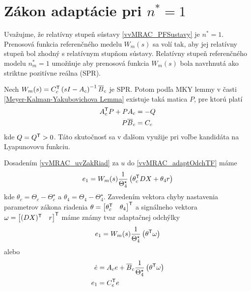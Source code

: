 ﻿\documentclass[a4paper, 10pt, ]{article}
\begin{document}
\section{Zákon adaptácie pri $n^* = 1$}


Uvažujme, že relatívny stupeň sústavy \eqref{vvMRAC_PFSustavy} je $n^* = 1$. Prenosová funkcia referenčného medelu $W_m(s)$ sa volí tak, aby jej relatívny stupeň bol zhodný s relatívnym stupňom sústavy. Relatívny stupeň referenčného modelu $n_m^* = 1$ umožňuje aby prenosová funkcia $W_m(s)$ bola navrhnutá ako striktne pozitívne reálna (SPR).

Nech $W_m(s) = C_c^{\mathsf{T}} \left( s I - A_c \right)^{-1} \overline{B}_c$ je SPR. Potom podľa MKY lemmy v časti \ref{Meyer-Kalman-Yakubovichova Lemma} existuje taká matica $P$, pre ktorú platí
\begin{subequations} \label{vvMRAC_dosledkyMKYlemmy}
	\begin{align}
		A_c^{\mathsf{T}} P  +  P  A_c  &=  - Q \\
		P  \overline{B}_c &=   C_c
	\end{align}
\end{subequations}
kde $Q = Q^{\mathsf{T}} > 0$. Táto skutočnosť sa v ďalšom využije pri voľbe kandidáta na Lyapunovovu funkciu.

Dosadením \eqref{vvMRAC_uvZakRiad} za $u$ do \eqref{vvMRAC_adaptOdchTF} máme
\begin{equation} \label{vvMRAC_adaptOdchmedziDefTF}
	e_1 = W_m(s) \frac{1}{\Theta_4^\star} \left( \theta_c^{\mathsf{T}} D X + \theta_4 r \right)
\end{equation}
kde $\theta_c = \Theta_c - \Theta_c^\star$ a $\theta_4 = \Theta_4 - \Theta_4^\star$. Zavedením vektora chyby nastavenia parametrov zákona riadenia $\theta = \begin{bmatrix}  \theta_c^{\mathsf{T}} & \theta_4 \end{bmatrix}^{\mathsf{T}}$ a signálneho vektora $\omega = \begin{bmatrix} (D X)^{\mathsf{T}} & r \end{bmatrix}^{\mathsf{T}}$ máme známy tvar adaptačnej odchýlky
\begin{equation} \label{vvMRAC_adaptOdchDefTF}
	e_1 = W_m(s)  \frac{1}{\Theta_4^\star} \left( \theta^{\mathsf{T}} \omega \right)
\end{equation}
alebo
\begin{subequations} \label{vvMRAC_adaptOdchDefSS}
	\begin{align}
		\dot{e} &= A_c e + \overline{B}_c \frac{1}{\Theta_4^\star} \left( \theta^{\mathsf{T}} \omega \right) \\
		e_1 &= C_c^{\mathsf{T}} e
	\end{align}
\end{subequations}
\end{document}
